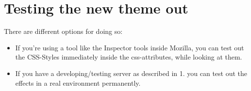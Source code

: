 \documentclass[letterpaper,10pt,english]{sphinxmanual}
\begin{document}
\section{Testing the new theme out}
\label{core/theming:testing-the-new-theme-out}
There are different options for doing so:
\begin{itemize}
\item {} 
If you're using a tool like the Inspector tools inside Mozilla, you can test out the CSS-Styles immediately inside the css-attributes, while looking at them.

\item {} 
If you have a developing/testing server as described in 1. you can test out the effects in a real environment permanently.

\end{itemize}
\end{document}
